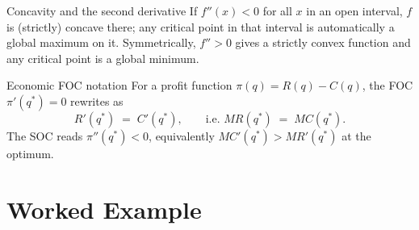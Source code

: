 \begin{rulebox}{Concavity and the second derivative}
If $f''(x) < 0$ for all $x$ in an open interval, $f$ is (strictly) concave
there; any critical point in that interval is automatically a global
maximum on it. Symmetrically, $f'' > 0$ gives a strictly convex function
and any critical point is a global minimum.
\end{rulebox}

\begin{rulebox}{Economic FOC notation}
For a profit function $\pi(q) = R(q) - C(q)$, the FOC $\pi'(q^*) = 0$
rewrites as
\[
R'(q^*) \;=\; C'(q^*), \qquad \text{i.e.\ } MR(q^*) \;=\; MC(q^*).
\]
The SOC reads $\pi''(q^*) < 0$, equivalently $MC'(q^*) > MR'(q^*)$ at the
optimum.
\end{rulebox}

\section{Worked Example}

